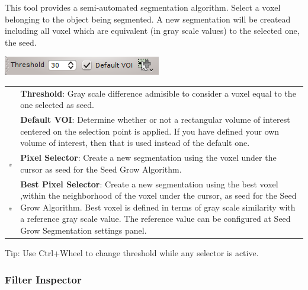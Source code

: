This tool provides a semi-automated segmentation algorithm. Select a voxel
belonging to the object being segmented. A new segmentation will be createad
including all voxel which are equivalent (in gray scale values) to the selected
one, the seed.

\begin{center}
\includegraphics{fig/SeedGrowSegmentation}
\end{center}
\vspace{0.3cm}

\begin{tabular}{m{0.8cm} m{13cm}}
& %
\textbf{Threshold}: Gray scale difference admisible to consider a voxel equal to
the one selected as seed. \\

& %
\textbf{Default VOI}: Determine whether or not a rectangular volume of interest
centered on the selection point is applied. If you have defined your own volume
of interest, then that is used instead of the default one.\\

\includegraphics[width=0.7cm]{../../frontend/toolbar/seedgrow/rsc/pixelSelector} &
\textbf{Pixel Selector}: Create a new segmentation using the voxel under the
cursor as seed for the Seed Grow Algorithm.\\

\includegraphics[width=0.7cm]{../../frontend/toolbar/seedgrow/rsc/bestPixelSelector} &
\textbf{Best Pixel Selector}: Create a new segmentation using the best voxel
,within the neighborhood of the voxel under the cursor, as seed for the Seed
Grow Algorithm. Best voxel is defined in terms of gray scale similarity with a
reference gray scale value. The reference value can be configured at Seed Grow
Segmentation settings panel.
\end{tabular}

Tip: Use Ctrl+Wheel to change threshold while any selector is active.

\subsubsection{Filter Inspector}

